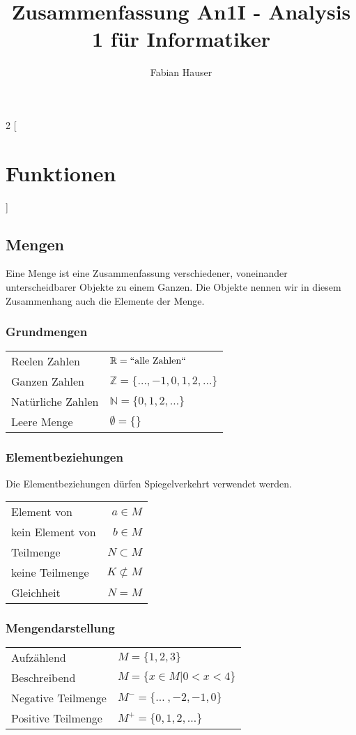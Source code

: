 

\title{Zusammenfassung An1I - Analysis 1 für Informatiker}
\author{Fabian Hauser}
 

\maketitle
\begin{multicols}{2}
[
\section{Funktionen}
]
\subsection{Mengen}
Eine Menge ist eine Zusammenfassung verschiedener, voneinander unterscheidbarer Objekte zu einem Ganzen. Die Objekte nennen wir in diesem Zusammenhang auch die
Elemente der Menge.

\subsubsection{Grundmengen}
\begin{tabular}{l l}
	Reelen Zahlen & $\mathbb{R}=``\text{alle Zahlen}``$ \\
	Ganzen Zahlen & $\mathbb{Z}=\{\dots ,-1,0,1,2,\dots\}$ \\
	Natürliche Zahlen & $\mathbb{N}=\{0,1,2,\dots\}$ \\
	Leere Menge & $\emptyset = \{\}$
\end{tabular}


\subsubsection{Elementbeziehungen}
Die Elementbeziehungen dürfen Spiegelverkehrt verwendet werden.

\begin{tabular}{l r}
	Element von & $a \in M$ \\
	kein Element von & $b \in M$ \\
	Teilmenge & $N \subset M$ \\
	keine Teilmenge & $K \not\subset M$ \\
	Gleichheit & $N = M$
\end{tabular}

\subsubsection{Mengendarstellung}
\begin{tabular}{l l}
	Aufzählend & $M = \{1,2,3\}$ \\
	Beschreibend & $M = \{x \in M|0<x<4\}$ \\
	Negative Teilmenge & $M^-= \{\dots\ ,-2,-1,0\}$ \\
	Positive Teilmenge & $M^+= \{0,1,2,\dots\}$
\end{tabular}


\end{multicols}
